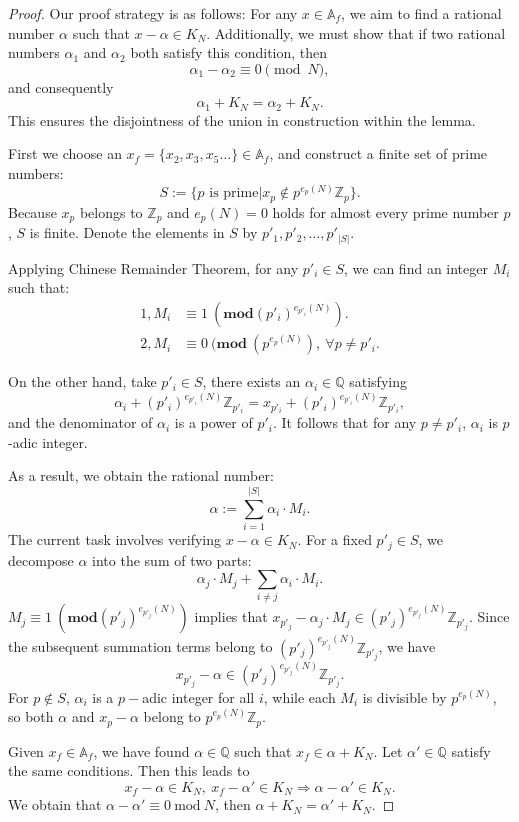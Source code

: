 \documentclass[11pt]{article}
\newcommand{\A}{\mathbb{A}}
\theoremstyle{remark}
\begin{document}
\begin{proof}
Our proof strategy is as follows: For any \( x \in \mathbb{A}_f \), we aim to find a rational number \( \alpha \) such that \( x - \alpha \in K_N \). Additionally, we must show that if two rational numbers \( \alpha_1 \) and \( \alpha_2 \) both satisfy this condition, then 
\[
\alpha_1 - \alpha_2 \equiv 0 \pmod{N},
\]
and consequently 
\[
\alpha_1 + K_N = \alpha_2 + K_N.
\]
This ensures the disjointness of the union in construction within the lemma.

First we choose an $x_f=\{x_2,x_3,x_5\dots\}\in \A_f$, and construct a finite set of prime numbers:
\[
S:=\{p \text{ is prime}| x_p\notin p^{e_p(N)}\mathbb{Z}_p\}.
\]
Because \(x_p\) belongs to \(\mathbb{Z}_p\) and \(e_p(N)=0\) holds for almost every prime number \(p\), $S$ is finite. Denote the elements in $S$ by \(p'_1, p'_{2},\dots,p'_{\lvert S\rvert}\). 

Applying Chinese Remainder Theorem, for any $p'_{i}\in S$, we can find an integer \(M_i\) such that:
\begin{align}
    1, M_i&\equiv 1\ (\textbf{mod} (p'_i)^{e_{p'_i}(N)}).\\
    2, M_i&\equiv 0\ (\textbf{mod}\ (p^{e_p(N)}),\ \forall p\neq p'_i.
\end{align}

On the other hand, take \(p'_i \in S\), there exists an $\alpha_i\in \mathbb{Q}$ satisfying
\[
\alpha_i+(p'_i)^{e_{p'_i}(N)}\mathbb{Z}_{p'_i}=x_{p'_i}+(p'_i)^{e_{p'_i}(N)}\mathbb{Z}_{p'_i},
\]
and the denominator of \(\alpha_i\) is a power of \(p'_i\). It follows that for any $p\neq p'_i$, \(\alpha_i\) is $p$-adic integer.

As a result, we obtain the rational number:
\[
\alpha:=\sum\limits_{i=1}^{\lvert S \rvert}\alpha_i\cdot M_i.
\]
The current task involves verifying \( x - \alpha \in K_N \). For a fixed $p'_j\in S$, we decompose \(\alpha\) into the sum of two parts:
\[\alpha_{j}\cdot M_{j}+\sum\limits_{i\neq j}\alpha_i\cdot M_i.\]
 \(M_{j}\equiv 1\ (\textbf{mod} (p'_j)^{e_{p'_j}(N)})\) implies that \(x_{p'_j}-\alpha_{j}\cdot M_{j}\in(p'_j)^{e_{p'_j}(N)}\mathbb{Z}_{p'_j}\). Since the subsequent summation terms belong to \( (p'_j)^{e_{p'_j}(N)}\mathbb{Z}_{p'_j} \), we have
\[
x_{p'_j} - \alpha \in (p'_j)^{e_{p'_j}(N)} \mathbb{Z}_{p'_j}.
\]
 For $p\notin S$, $\alpha_i$ is a $p-$adic integer for all $i$, while each \( M_i \) is divisible by \( p^{e_p(N)} \), so both $\alpha$ and $x_p-\alpha$ belong to $p^{e_p(N)}\mathbb{Z}_p$.

Given $x_f\in \A_f$, we have found $\alpha\in \mathbb{Q}$ such that $x_f\in \alpha+K_N$. Let $\alpha'\in \mathbb{Q}$ satisfy the same conditions. Then this leads to
$$
x_f-\alpha\in K_N,\
x_f-\alpha'\in K_N\Rightarrow
\alpha-\alpha'\in K_N.
$$
We obtain that $\alpha-\alpha'\equiv0\ \text{mod}\ N$, then $\alpha+K_N=\alpha'+K_N.$
\end{proof}
\end{document}
